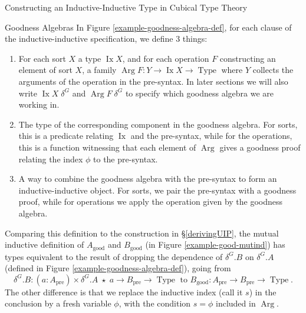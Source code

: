 \documentclass[runningheads]{llncs}
\newcommand{\erase}[1]{{}}
\DeclareMathOperator{\USet}{Type}
\DeclareMathOperator{\Arg}{Arg}
\DeclareMathOperator{\Ix}{Ix}
\newcommand{\pre}[1]{{#1}_\text{pre}}
\newcommand{\good}[1]{{#1}_\text{good}}
\begin{document}
\begin{section}{Constructing an Inductive-Inductive Type in Cubical Type Theory}
\begin{subsection}{Goodness Algebras}
In Figure \ref{example-goodness-algebra-def}, for each clause of the inductive-inductive specification, we define 3 things:
\begin{enumerate}
    \item For each sort $X$ a type $\Ix X$, and for each operation $F$ constructing an element of sort $X$, a family $\Arg F : Y \to \Ix X \to \USet$ where $Y$ collects the arguments of the operation in the pre-syntax. In later sections we will also write $\Ix X\;\delta^G$ and $\Arg F\;\delta^G$ to specify which goodness algebra we are working in.
    \item The type of the corresponding component in the goodness algebra. For sorts, this is a predicate relating $\Ix$ and the pre-syntax, while for the operations, this is a function witnessing that each element of $\Arg$ gives a goodness proof relating the index $\phi$ to the pre-syntax.
    \item A way to combine the goodness algebra with the pre-syntax to form an inductive-inductive object. For sorts, we pair the pre-syntax with a goodness proof, while for operations we apply the operation given by the goodness algebra.
\end{enumerate}

Comparing this definition to the construction in \S\ref{derivingUIP}, the mutual inductive definition of $\good{A}$ and $\good{B}$ (in Figure \ref{example-good-mutind}) has types equivalent to the result of dropping the dependence of $\delta^G.B$ on $\delta^G.A$ (defined in Figure \ref{example-goodness-algebra-def}), going from \[\delta^G.B : (a : \pre{A}) \times \delta^G.A\;\star\;a \to \pre{B} \to \USet \text{ to } \good{B} : \pre{A} \to \pre{B} \to \USet.\] The other difference is that we replace the inductive index (call it $s$) in the conclusion by a fresh variable $\phi$, with the condition $s = \phi$ included in $\Arg$.

\erase{
Consider the sort $B$. The inductive index of $B$ is $a : A$, so we set $\Ix B = A$. Our goodness algebra has a predicate $\delta^G.B : \Ix B \to \pre{B} \to \USet$, which defines a relation between the inductive index and the pre-syntax. And we define an elements of $B\;\phi$ to be pairs of pre-syntax with a proof that it is related to $\phi$ by the goodness algebra. The definition of the sort $A$ follows the same pattern, but there $A$ has no inductive index, or rather has $\top$ as the inductive index, so we set $\Ix A = \top$.

}
\end{subsection}
\end{section}
\end{document}
